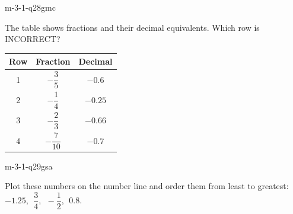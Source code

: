 \begin{practiceQuestion}{m-3-1-q28}{gmc}
\begin{questionText}
The table shows fractions and their decimal equivalents. Which row is INCORRECT?

\begin{center}
\begin{tabular}{|c|c|c|}
\hline
\textbf{Row} & \textbf{Fraction} & \textbf{Decimal} \\
\hline
1 & $-\dfrac{3}{5}$ & $-0.6$ \\[4pt]
\hline
2 & $-\dfrac{1}{4}$ & $-0.25$ \\[4pt]
\hline
3 & $-\dfrac{2}{3}$ & $-0.66$ \\[4pt]
\hline
4 & $-\dfrac{7}{10}$ & $-0.7$ \\[4pt]
\hline
\end{tabular}
\end{center}
\end{questionText}
\end{practiceQuestion}

\begin{practiceQuestion}{m-3-1-q29}{gsa}
\begin{questionText}
Plot these numbers on the number line and order them from least to greatest: $-1.25$, $\;\dfrac{3}{4}$, $\;-\dfrac{1}{2}$, $\;0.8$.

\begin{center}
\end{center}
\end{questionText}
\end{practiceQuestion}

